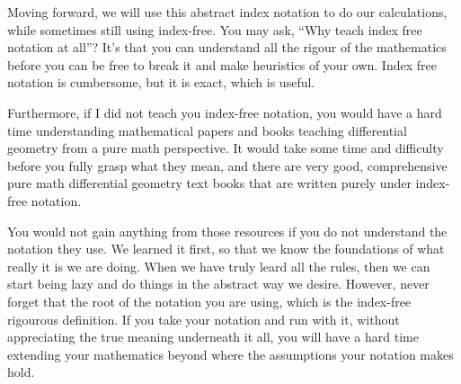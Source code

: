 	Moving forward, we will use this abstract index notation to do our calculations, while sometimes still using index-free.
	You may ask, ``Why teach index free notation at all''? It's that you can understand
	all the rigour of the mathematics before you can be free to break it and make heuristics 
	of your own. Index free notation is cumbersome, but it is exact, which is useful.

	Furthermore, if I did not teach you index-free notation, you would have a hard time understanding
	mathematical papers and books teaching differential geometry from a pure math perspective. 
	It would take some time and difficulty before you fully grasp what they mean, and there are very good, 
	comprehensive pure math differential geometry text books that are written purely under index-free
	notation. 

	You would not gain anything from those resources if you do not understand the notation they use.
	We learned it first, so that we know the foundations of what really it is we are doing.
	When we have truly leard all the rules, then we can start being lazy and do things
	in the abstract way we desire. However, never forget that the root of the notation you are using,
	which is the index-free rigourous definition. If you take your notation and run with it, 
	without appreciating the true meaning underneath it all, you will have a hard time extending
	your mathematics beyond where the assumptions your notation makes hold.
